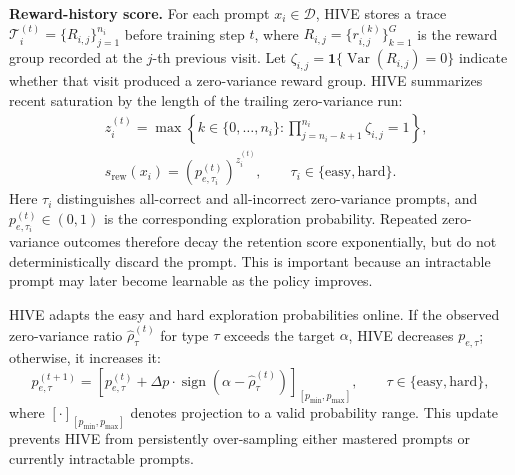 \textbf{Reward-history score.}
For each prompt $x_i\in\mathcal{D}$, HIVE stores a trace $\mathcal{T}_i^{(t)}=\{R_{i,j}\}_{j=1}^{n_i}$ before training step $t$, where $R_{i,j}=\{r_{i,j}^{(k)}\}_{k=1}^{G}$ is the reward group recorded at the $j$-th previous visit. Let $\zeta_{i,j}=\mathbf{1}\{\operatorname{Var}(R_{i,j})=0\}$ indicate whether that visit produced a zero-variance reward group. HIVE summarizes recent saturation by the length of the trailing zero-variance run:
\begin{equation}
\label{eq:stage1_reward_score}
\begin{aligned}
&z_i^{(t)}
=\max\left\{k\in\{0,\ldots,n_i\}:
\prod_{j=n_i-k+1}^{n_i}\zeta_{i,j}=1\right\},\\
&s_{\mathrm{rew}}(x_i)
=\left(p_{e,\tau_i}^{(t)}\right)^{z_i^{(t)}},
\qquad \tau_i\in\{\mathrm{easy},\mathrm{hard}\}.
\end{aligned}
\end{equation}
Here $\tau_i$ distinguishes all-correct and all-incorrect zero-variance prompts, and $p_{e,\tau_i}^{(t)}\in(0,1)$ is the corresponding exploration probability. Repeated zero-variance outcomes therefore decay the retention score exponentially, but do not deterministically discard the prompt. This is important because an intractable prompt may later become learnable as the policy improves.

HIVE adapts the easy and hard exploration probabilities online. If the observed zero-variance ratio $\hat{\rho}_{\tau}^{(t)}$ for type $\tau$ exceeds the target $\alpha$, HIVE decreases $p_{e,\tau}$; otherwise, it increases it:
\begin{equation}
\label{eq:adaptive_pe}
p_{e,\tau}^{(t+1)}
=
\left[
p_{e,\tau}^{(t)}
+\Delta p\cdot\operatorname{sign}\!\left(\alpha-\hat{\rho}_{\tau}^{(t)}\right)
\right]_{[p_{\min},p_{\max}]},
\qquad \tau\in\{\mathrm{easy},\mathrm{hard}\},
\end{equation}
where $[\cdot]_{[p_{\min},p_{\max}]}$ denotes projection to a valid probability range. This update prevents HIVE from persistently over-sampling either mastered prompts or currently intractable prompts.

